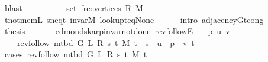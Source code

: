 \begin{isabellebody}
\ blast\isanewline
\ \ \isamarkupfalse%
\isanewline
\ \ \isamarkupfalse%
\ \isamarkupfalse%
\ {\isachardoublequoteopen}{\isachardot}{\kern0pt}{\isachardot}{\kern0pt}{\isachardot}{\kern0pt}\ {\isacharequal}{\kern0pt}\ set\ {\isacharparenleft}{\kern0pt}free{\isacharunderscore}{\kern0pt}vertices\ R\ M{\isacharparenright}{\kern0pt}{\isachardoublequoteclose}\isanewline
\ \ \ \ \isamarkupfalse%
\ t{\isacharunderscore}{\kern0pt}not{\isacharunderscore}{\kern0pt}mem{\isacharunderscore}{\kern0pt}L\ s{\isacharunderscore}{\kern0pt}neq{\isacharunderscore}{\kern0pt}t\ invar{\isacharunderscore}{\kern0pt}M\ lookup{\isacharunderscore}{\kern0pt}t{\isacharunderscore}{\kern0pt}eq{\isacharunderscore}{\kern0pt}None\isanewline
\ \ \ \ \isamarkupfalse%
\ {\isacharparenleft}{\kern0pt}intro\ adjacency{\isacharunderscore}{\kern0pt}G{}{\isacharunderscore}{\kern0pt}t{\isacharunderscore}{\kern0pt}cong{\isacharparenright}{\kern0pt}\isanewline
\ \ \isamarkupfalse%
\ \isamarkupfalse%
\ {\isacharquery}{\kern0pt}thesis\isanewline
\ \ \ \ \isacommand{{\isachardot}{\kern0pt}}\isamarkupfalse%
\isanewline
{}\isamarkupfalse%
%
\endisatagproof
{\isafoldproof}%
%
\isadelimproof
\isanewline
%
\endisadelimproof
%
\isadeliminvisible
\isanewline
%
\endisadeliminvisible
%
\isataginvisible
{}\isamarkupfalse%
\ {\isacharparenleft}{\kern0pt}\ edmonds{\isacharunderscore}{\kern0pt}karp{\isacharunderscore}{\kern0pt}invar{\isacharunderscore}{\kern0pt}not{\isacharunderscore}{\kern0pt}done{\isacharunderscore}{\kern0pt}{}{\isacharparenright}{\kern0pt}\ rev{\isacharunderscore}{\kern0pt}followE{\isacharcolon}{\kern0pt}\isanewline
\ \ \ p\ u\ v\ \isanewline
\ \ \ \ {\isachardoublequoteopen}rev{\isacharunderscore}{\kern0pt}follow\ {\isacharparenleft}{\kern0pt}m{\isacharunderscore}{\kern0pt}tbd\ G\ L\ R\ s\ t\ M{\isacharparenright}{\kern0pt}\ t\ {\isacharequal}{\kern0pt}\ s\ {\isacharhash}{\kern0pt}\ u\ {\isacharhash}{\kern0pt}\ p\ {\isacharat}{\kern0pt}\ {\isacharbrackleft}{\kern0pt}v{\isacharcomma}{\kern0pt}\ t{\isacharbrackright}{\kern0pt}{\isachardoublequoteclose}%
\endisataginvisible
{\isafoldinvisible}%
%
\isadeliminvisible
\isanewline
%
\endisadeliminvisible
%
\isadelimproof
%
\endisadelimproof
%
\isatagproof
{}\isamarkupfalse%
\ {\isacharparenleft}{\kern0pt}cases\ {\isachardoublequoteopen}rev{\isacharunderscore}{\kern0pt}follow\ {\isacharparenleft}{\kern0pt}m{\isacharunderscore}{\kern0pt}tbd\ G\ L\ R\ s\ t\ M{\isacharparenright}{\kern0pt}\ t{\isachardoublequoteclose}{\isacharparenright}{\kern0pt}\isanewline

\end{isabellebody}
